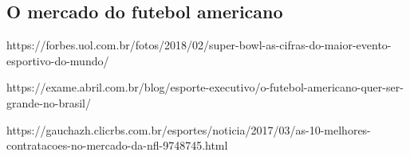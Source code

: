 \subsection{O mercado do futebol americano}

https://forbes.uol.com.br/fotos/2018/02/super-bowl-as-cifras-do-maior-evento-esportivo-do-mundo/

https://exame.abril.com.br/blog/esporte-executivo/o-futebol-americano-quer-ser-grande-no-brasil/

https://gauchazh.clicrbs.com.br/esportes/noticia/2017/03/as-10-melhores-contratacoes-no-mercado-da-nfl-9748745.html